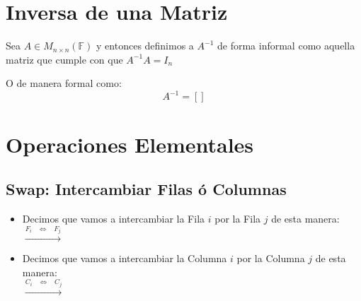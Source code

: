 \documentclass[12pt]{report}                                    %
\DeclareMathOperator \Space {\quad}                             %
\DeclareMathOperator \MiniSpace {\;}                            %
\newcommand \lequal {\MiniSpace \Leftrightarrow \MiniSpace}     %
\newcommand \longto {\longrightarrow}                           %
\newcommand{\Brackets}[1]{\left[ #1 \right]}                    %
\begin{document}
        \clearpage
        \section{Inversa de una Matriz}

            Sea $A \in M_{n \times n}(\mathbb{F})$ y entonces definimos a $A^{-1}$ 
            de forma informal como aquella matriz que cumple con que $A^{-1}A = I_{n}$

            O de manera formal como:
            \begin{equation}
                A^{-1} = \Brackets{}
            \end{equation}






        \clearpage
        \section{Operaciones Elementales}

            \subsection{Swap: Intercambiar Filas ó Columnas}

                \begin{itemize}
                    \item
                        Decimos que vamos a intercambiar la Fila $i$ por la Fila $j$ de
                        esta manera:\\
                        $\overset{F_i \lequal F_j}{\longto}$

                    \item
                        Decimos que vamos a intercambiar la Columna $i$ por la Columna $j$ de
                        esta manera:\\
                        $\overset{C_i \lequal C_j}{\longto}$
                \end{itemize}
\end{document}
